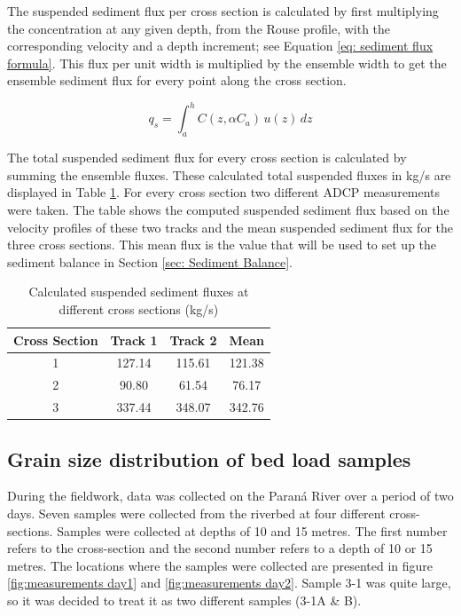 The suspended sediment flux per cross section is calculated by first multiplying the concentration at any given depth, from the Rouse profile, with the corresponding velocity and a depth increment; see Equation \ref{eq: sediment flux formula}. This flux per unit width is multiplied by the ensemble width to get the ensemble sediment flux for every point along the cross section. 

\begin{equation}
    q_{s} = \int_{a}^{h} C(z, \alpha C_a) \, u(z) \, dz
    \label{eq: sediment flux formula}
\end{equation}

The total suspended sediment flux for every cross section is calculated by summing the ensemble fluxes. These calculated total suspended fluxes in kg/s are displayed in Table \ref{tab:Calculated suspended sediment flux}. For every cross section two different ADCP measurements were taken. The table shows the computed suspended sediment flux based on the velocity profiles of these two tracks and the mean suspended sediment flux for the three cross sections. This mean flux is the value that will be used to set up the sediment balance in Section \ref{sec: Sediment Balance}. 
 
\begin{table}[H]
    \centering
    \caption{Calculated suspended sediment fluxes at different cross sections (kg/s)}
    \label{tab:Calculated suspended sediment flux}
    \setlength{\tabcolsep}{8pt}
    \begin{tabular}{c c c c}
        \hline
        Cross Section & Track 1 & Track 2 & Mean\\
        \hline
        1 & 127.14 & 115.61 & 121.38\\
        2 & 90.80  & 61.54  & 76.17\\
        3 & 337.44 & 348.07 & 342.76\\
        \hline
    \end{tabular}
\end{table}

\subsection{Grain size distribution of bed load samples}
During the fieldwork, data was collected on the Paraná River over a period of two days. Seven samples were collected from the riverbed at four different cross-sections. Samples were collected at depths of 10 and 15 metres. The first number refers to the cross-section and the second number refers to a depth of 10 or 15 metres. The locations where the samples were collected are presented in figure \ref{fig:measurements day1} and \ref{fig:measurements day2}. Sample 3-1 was quite large, so it was decided to treat it as two different samples (3-1A \& B). 


